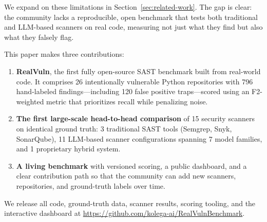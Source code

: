 \noindent
We expand on these limitations in Section~\ref{sec:related-work}. The gap is
clear: the community lacks a reproducible, open benchmark that tests both
traditional and LLM-based scanners on real code, measuring not just what they
find but also what they falsely flag.

This paper makes three contributions:

\begin{enumerate}
  \item \textbf{RealVuln}, the first fully open-source SAST benchmark built
    from real-world code. It comprises 26 intentionally vulnerable Python
    repositories with 796 hand-labeled findings---including 120 false positive
    traps---scored using an F2-weighted metric that prioritizes recall while
    penalizing noise.
  \item \textbf{The first large-scale head-to-head comparison} of 15 security
    scanners on identical ground truth: 3 traditional SAST tools (Semgrep,
    Snyk, SonarQube), 11 LLM-based scanner configurations spanning 7 model families, and
    1 proprietary hybrid system.
  \item \textbf{A living benchmark} with versioned scoring, a public
    dashboard, and a clear contribution path so that the community can add new
    scanners, repositories, and ground-truth labels over time.
\end{enumerate}

We release all code, ground-truth data, scanner results, scoring tooling, and
the interactive dashboard at
\url{https://github.com/kolega-ai/RealVulnBenchmark}.
